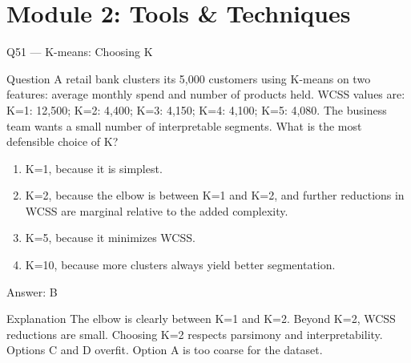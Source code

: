 \documentclass[aspectratio=169,8pt]{beamer}
\begin{document}
	\section{Module 2: Tools \& Techniques}
	
	\begin{frame}{Q51 --- K-means: Choosing K}
		\begin{block}{Question}
			A retail bank clusters its 5,000 customers using K-means on two features: average monthly spend and number of products held. WCSS values are: K=1: 12,500; K=2: 4,400; K=3: 4,150; K=4: 4,100; K=5: 4,080. The business team wants a small number of interpretable segments. What is the most defensible choice of K?
		\end{block}
		\begin{enumerate}
			\item K=1, because it is simplest.
			\item K=2, because the elbow is between K=1 and K=2, and further reductions in WCSS are marginal relative to the added complexity.
			\item K=5, because it minimizes WCSS.
			\item K=10, because more clusters always yield better segmentation.
		\end{enumerate}
		\begin{exampleblock}{Answer: B}\end{exampleblock}
		\begin{block}{Explanation}
			The elbow is clearly between K=1 and K=2. Beyond K=2, WCSS reductions are small. Choosing K=2 respects parsimony and interpretability. Options C and D overfit. Option A is too coarse for the dataset.
		\end{block}
	\end{frame}
	
\end{document}
